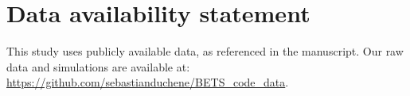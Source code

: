 \documentclass[10pt,letterpaper]{article}
\begin{document}
\section*{Data availability statement}
This study uses publicly available data, as referenced in the manuscript. Our raw data and simulations are available at: \url{https://github.com/sebastianduchene/BETS\_code\_data}.


\nolinenumbers


%
%
% 





\end{document}
